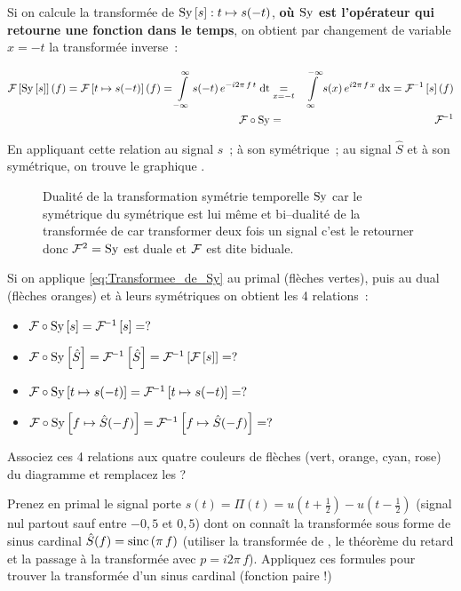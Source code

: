 Si on calcule la transformée de $\mathrm{Sy}\left[s\right] : t\mapsto s(-t)$, \textbf{où 
$\mathrm{Sy}{}$ est l'opérateur qui retourne une fonction dans le temps}, on
obtient par changement de variable $x=-t$ la transformée inverse~:

\begin{eqnarray}
  \label{eq:Transformee_de_Sy}
  \mathcal{F}\left[\mathrm{Sy}\left[s\right]\right](f)=\mathcal{F}\left[t\mapsto s(-t)\right](f)=\int\limits_{-\infty}^{\infty}{s(-t)\,e^{-i2\pi\,f\,t}\;\mathrm{d{t}}} & \underset{x=-t}{=} &\int\limits_{\infty}^{-\infty}{s(x)\,e^{i2\pi\,f\,x}\;\mathrm{d{x}}} = \mathcal{F}^{\!-1}\left[s\right](f) \nonumber\\
  \mathcal{F}\circ\mathrm{Sy} &= & \mathcal{F}^{\!-1}
\end{eqnarray}

En appliquant cette relation au signal $s$~; à son symétrique~; au signal $\hat{S}$ et à son symétrique, on trouve le graphique . 
\begin{figure}[ht!]
  \centering
  \caption{Dualité de la transformation symétrie temporelle $\mathrm{Sy}$ car le symétrique du symétrique est lui même et bi--dualité de la transformée de \Fourier{} car transformer deux fois un signal c'est le retourner donc $\mathcal{F}{}^2=\mathrm{Sy}{}$ est duale et $\mathcal{F}{}$ est dite biduale.}
  \label{fig:dualite_4_f}
\end{figure}

\begin{exercice}
  Si on applique \eqref{eq:Transformee_de_Sy} au primal (flèches vertes), puis au dual (flèches oranges) et à leurs symétriques on obtient les 4 relations~:
  \begin{itemize}
  \item $\mathcal{F}\circ\mathrm{Sy}\left[s\right] = \mathcal{F}^{\!-1}\left[s\right] = ?$
  \item $\mathcal{F}\circ\mathrm{Sy}\left[\hat{S}\right] = \mathcal{F}^{\!-1}\left[\hat{S}\right] = \mathcal{F}^{\!-1}\left[\mathcal{F}\left[s\right]\right]= ?$
  \item $\mathcal{F}\circ\mathrm{Sy}\left[t\mapsto s(-t)\right] = \mathcal{F}^{\!-1}\left[t\mapsto s(-t)\right] = ?$
  \item $\mathcal{F}\circ\mathrm{Sy}\left[f\mapsto \hat{S}(-f)\right] = \mathcal{F}^{\!-1}\left[f\mapsto \hat{S}(-f)\right] = ?$
  \end{itemize}

Associez ces 4 relations aux quatre couleurs de flèches (vert, orange, cyan, rose) du diagramme et remplacez les \og{}?\fg{}

Prenez en primal le signal porte $s(t)=\Pi(t)=u(t+\frac{1}{2})-u(t-\frac{1}{2})$ (signal nul partout sauf entre $-0,5$ et $0,5$) dont on connaît la transformée sous forme de sinus cardinal $\hat{S}(f)=\mathop{\mathrm{sinc}}\left(\pi\,f\right)$ (utiliser la transformée de \Laplace, le théorème du retard et la passage à la transformée avec $p=i2\pi\,f$). Appliquez ces formules pour trouver la transformée d'un sinus cardinal (fonction paire !)
\end{exercice}


